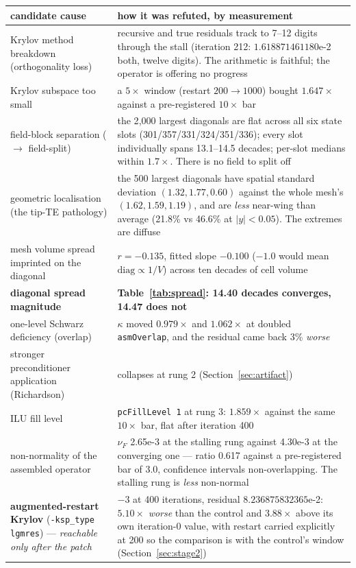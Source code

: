 \documentclass[11pt,a4paper]{article}
\begin{document}
\begin{table}[htbp]
\centering\scriptsize
\begin{tabular}{@{}L{5.0cm}L{9.4cm}@{}}
\toprule
candidate cause & how it was refuted, by measurement \\
\midrule
Krylov method breakdown (orthogonality loss) & recursive and true residuals track to 7--12 digits through the stall (iteration 212: \(1.618871461180\)e-2 both, twelve digits). The arithmetic is faithful; the operator is offering no progress \\
Krylov subspace too small & a \(5\times\) window (restart \(200\rightarrow1000\)) bought \(1.647\times\) against a pre-registered \(10\times\) bar \\
field-block separation (\(\rightarrow\) field-split) & the 2{,}000 largest diagonals are flat across all six state slots (301/357/331/324/351/336); every slot individually spans 13.1--14.5 decades; per-slot medians within \(1.7\times\). There is no field to split off \\
geometric localisation (the tip-TE pathology) & the 500 largest diagonals have spatial standard deviation \((1.32,1.77,0.60)\) against the whole mesh's \((1.62,1.59,1.19)\), and are \emph{less} near-wing than average (21.8\% vs 46.6\% at \(\lvert y\rvert<0.05\)). The extremes are diffuse \\
mesh volume spread imprinted on the diagonal & \(r=-0.135\), fitted slope \(-0.100\) (\(-1.0\) would mean \(\mathrm{diag}\propto 1/V\)) across ten decades of cell volume \\
\textbf{diagonal spread magnitude} & \textbf{Table~\ref{tab:spread}: 14.40 decades converges, 14.47 does not} \\
one-level Schwarz deficiency (overlap) & \(\kappa\) moved \(0.979\times\) and \(1.062\times\) at doubled \texttt{asmOverlap}, and the residual came back 3\% \emph{worse} \\
stronger preconditioner application (Richardson) & collapses at rung 2 (Section~\ref{sec:artifact}) \\
ILU fill level & \texttt{pcFillLevel 1} at rung 3: \(1.859\times\) against the same \(10\times\) bar, flat after iteration 400 \\
non-normality of the assembled operator & \(\nu_F\) 2.65e-3 at the stalling rung against 4.30e-3 at the converging one --- ratio 0.617 against a pre-registered bar of 3.0, confidence intervals non-overlapping. The stalling rung is \emph{less} non-normal \\
\addlinespace
\textbf{augmented-restart Krylov} (\texttt{-ksp\_type lgmres}) --- \emph{reachable only after the patch} & \(-3\) at 400 iterations, residual \(8.236875832365\)e-2: \(5.10\times\) \emph{worse} than the control and \(3.88\times\) above its own iteration-0 value, with restart carried explicitly at 200 so the comparison is with the control's window (Section~\ref{sec:stage2}) \\

\end{tabular}
\end{table}
\end{document}
